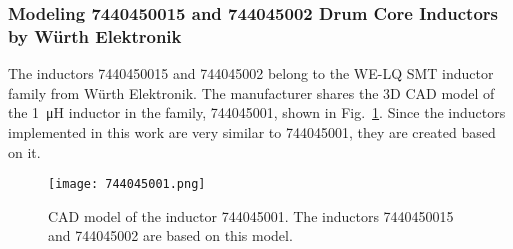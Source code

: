 \subsubsection{Modeling 7440450015 and 744045002 Drum Core Inductors by Würth Elektronik}
The inductors 7440450015 and 744045002 belong to the WE-LQ SMT inductor family from Würth Elektronik. The manufacturer shares the 3D CAD model of the \SI{1}{\micro\henry} inductor in the family, 744045001, shown in Fig.~\ref{fig:744045001}. Since the inductors implemented in this work are very similar to 744045001, they are created based on it.
\begin{figure}[ptb]
	\centering
	\texttt{[image: 744045001.png]}
	\caption{CAD model of the inductor 744045001. The inductors 7440450015 and 744045002 are based on this model.}
	\label{fig:744045001}
\end{figure}
